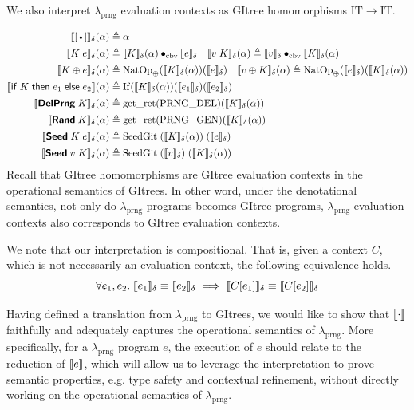 \documentclass{article}
\theoremstyle{definition}
\theoremstyle{plain}
\theoremstyle{remark}
\newcommand{\prng}{\mathrm{prng}}
\newcommand{\IT}{\mathrm{IT}}
\newcommand{\getret}{\mathrm{get\_ret}}
\newcommand{\cbvap}{\bullet_{\text{cbv}}}
\newcommand{\gnatop}[1]{\mathrm{NatOp}_{#1}}
\newcommand{\gif}{\mathrm{If}}
\begin{document}

We also interpret \(\lambda_\prng\) evaluation contexts as GItree homomorphisms \(\IT\to\IT\).

\[
  \begin{aligned}
    \sem{\ctxhole}_\senv(\alpha) &\eqdef \alpha\\
    \sem{K\;e}_\senv(\alpha) &\eqdef \sem{K}_\senv(\alpha)\cbvap\sem{e}_\senv
    \quad \sem{v\;K}_\senv(\alpha) \eqdef \sem{v}_\senv\cbvap\sem{K}_\senv(\alpha)\\
    \sem{K \oplus e}_\senv(\alpha) &\eqdef \gnatop{\oplus}(\sem{K}_\senv(\alpha))(\sem{e}_\senv)
    \quad \sem{v \oplus K}_\senv(\alpha) \eqdef \gnatop{\oplus}(\sem{e}_\senv)(\sem{K}_\senv(\alpha))\\
    \sem{\syn{if}\;K\;\syn{then}\;e_1\;\syn{else}\;e_2}(\alpha) & \eqdef \gif(\sem{K}_\senv(\alpha))(\sem{e_1}_\senv)(\sem{e_2}_\senv)\\
    \sem{\kw{DelPrng}\;K}_\senv(\alpha) &\eqdef \getret(\mathrm{PRNG\_DEL})(\sem{K}_\senv(\alpha)) \\
    \sem{\kw{Rand}\;K}_\senv(\alpha) &\eqdef \getret(\mathrm{PRNG\_GEN})(\sem{K}_\senv(\alpha)) \\
    \sem{\kw{Seed}\;K\;e}_\senv(\alpha) &\eqdef \mathrm{SeedGit}\;(\sem{K}_\senv(\alpha))\;(\sem{e}_\senv)\\
    \sem{\kw{Seed}\;v\;K}_\senv(\alpha) &\eqdef \mathrm{SeedGit}\;(\sem{v}_\senv)\;(\sem{K}_\senv(\alpha))\\
  \end{aligned}
\]
Recall that GItree homomorphisms are GItree evaluation contexts in the operational semantics of GItrees.
In other word, under the denotational semantics,
not only do \(\lambda_\prng\) programs becomes GItree programs,
\(\lambda_\prng\) evaluation contexts also corresponds to GItree evaluation contexts.\par

We note that our interpretation is compositional. That is, given a context \(C\), which is not necessarily an evaluation context, the following equivalence holds.
\[
  \forall e_1,e_2.\;
  \llbracket {e_1} \rrbracket_\delta \equiv \llbracket {e_2} \rrbracket_\delta
  \implies
  \llbracket {C[e_1]} \rrbracket_\delta \equiv \llbracket {C[e_2]} \rrbracket_\delta
\]

Having defined a translation from \(\lambda_\prng\) to GItrees,
we would like to show that \(\llbracket {\cdot} \rrbracket\) faithfully and adequately captures the operational semantics of \(\lambda_\prng\).
More specifically, for a \(\lambda_\prng\) program \(e\), the execution of \(e\) should relate to the reduction of \(\llbracket {e} \rrbracket\),
which will allow us to leverage the interpretation to prove semantic properties, e.g. type safety and contextual refinement, without directly working on the operational semantics of \(\lambda_\prng\).\par
\end{document}
